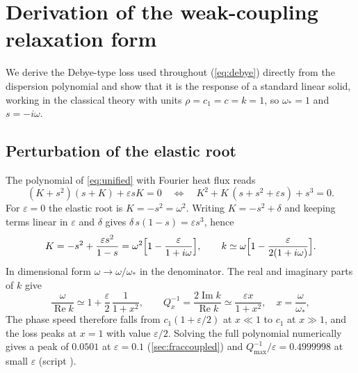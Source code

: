 \section{Derivation of the weak-coupling relaxation form}\label{app:debye}

We derive the Debye-type loss used throughout (\cref{eq:debye}) directly from the dispersion polynomial and show that it is the response of a standard linear solid, working in the classical theory with units $\rho=c_1=c=k=1$, so $\omega_*=1$ and $s=-i\omega$.

\subsection{Perturbation of the elastic root}
The polynomial of \cref{eq:unified} with Fourier heat flux reads
\begin{equation}
(K+s^2)(s+K)+\varepsilon sK=0\quad\Longleftrightarrow\quad K^2+K\,(s+s^2+\varepsilon s)+s^3=0 .
\end{equation}
For $\varepsilon=0$ the elastic root is $K=-s^2=\omega^2$. Writing $K=-s^2+\delta$ and keeping terms linear in $\varepsilon$ and $\delta$ gives $\delta\,s(1-s)=\varepsilon s^3$, hence
\begin{equation}
K=-s^2+\frac{\varepsilon s^2}{1-s}=\omega^2\Bigl[1-\frac{\varepsilon}{1+i\omega}\Bigr],\qquad
k\simeq\omega\Bigl[1-\frac{\varepsilon}{2(1+i\omega)}\Bigr].
\end{equation}
In dimensional form $\omega\to\omega/\omega_*$ in the denominator. The real and imaginary parts of $k$ give
\begin{equation}
\frac{\omega}{\operatorname{Re}k}\simeq1+\frac{\varepsilon}{2}\,\frac{1}{1+x^2},\qquad
Q_x^{-1}=\frac{2\operatorname{Im}k}{\operatorname{Re}k}\simeq\frac{\varepsilon x}{1+x^2},\quad x=\frac{\omega}{\omega_*},
\end{equation}
The phase speed therefore falls from $c_1(1+\varepsilon/2)$ at $x\ll1$ to $c_1$ at $x\gg1$, and the loss peaks at $x=1$ with value $\varepsilon/2$. Solving the full polynomial numerically gives a peak of $0.0501$ at $\varepsilon=0.1$ (\cref{sec:fraccoupled}) and $Q^{-1}_{\max}/\varepsilon=0.4999998$ at small $\varepsilon$ (script ).

